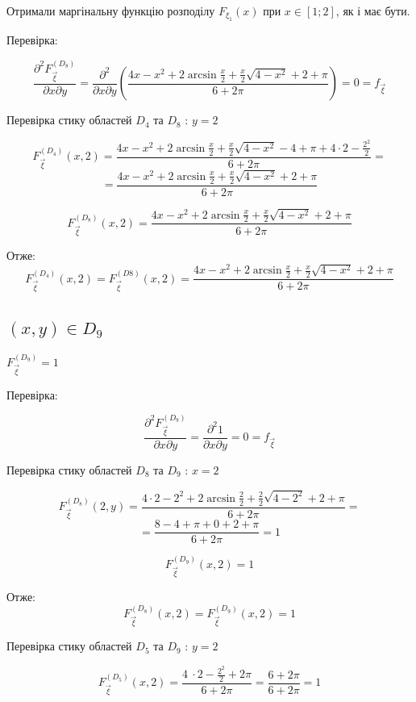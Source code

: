\documentclass[14pt, a4paper, ukrainian]{extreport}
\begin{document}
	Отримали маргінальну функцію розподілу $ F_{\xi_1} (x) $ при $x \in [1; 2]$, як і має бути.
	
	Перевірка:
	
	$$\frac{\partial^2F_{\vec\xi}^{\left(D_8\right)}}{\partial x \partial y} = \frac{\partial^2}{\partial x \partial y} \left(\frac{4x - x^2 + 2\arcsin\frac{x}{2} + \frac{x}{2}\sqrt{4-x^2} + 2 + \pi}{6+2\pi}\right) = 0 = f_{\vec\xi}
	$$
	
	Перевірка стику областей $D_4$ та $D_8$ : $ y = 2$ 
	
	$$ F_{\vec\xi}^{\left({D_4}\right)}(x, 2) = \frac{4x -x^2 + 2\arcsin\frac{x}{2} + \frac{x}{2}\sqrt{4-x^2} - 4 + \pi + 4\cdot 2 - \frac{2^2}{2}}{6+2\pi} = 
	$$
	$$ = \frac{4x -x^2 + 2\arcsin\frac{x}{2} + \frac{x}{2}\sqrt{4-x^2} + 2 + \pi }{6+2\pi}
	$$
	
	$$ F_{\vec\xi}^{\left({D_8}\right)}(x, 2) =  \frac{4x - x^2 + 2\arcsin\frac{x}{2} + \frac{x}{2}\sqrt{4-x^2} + 2 + \pi}{6+2\pi}
	$$
	
	Отже:	
	$$  F_{\vec\xi}^{\left({D_4}\right)}(x, 2) =  F_{\vec\xi}^{\left({D8}\right)}(x, 2) = \frac{4x - x^2 + 2\arcsin\frac{x}{2} + \frac{x}{2}\sqrt{4-x^2} + 2 + \pi}{6+2\pi}
	$$
	
	\subsection{$(x, y) \in D_9$}
	
	$F_{\vec \xi}^{\left(D_9\right)} = 1$
	
	Перевірка: 
	
	$$\frac{\partial^2F_{\vec\xi}^{\left(D_9\right)}}{\partial x \partial y} = \frac{\partial^2 1 }{\partial x \partial y} = 0 = f_{\vec{\xi}}
	$$
	
	Перевірка стику областей $D_8$ та $D_9$ : $ x = 2$ 
	
	$$ F_{\vec\xi}^{\left({D_8}\right)}(2, y) = \frac{4\cdot 2 -2^2 + 2\arcsin\frac{2}{2} + \frac{2}{2}\sqrt{4-2^2} + 2 + \pi }{6+2\pi} = 
	$$
	$$ = \frac{8 -4 + \pi + 0 + 2 + \pi }{6+2\pi} = 1
	$$
	
	$$ F_{\vec\xi}^{\left({D_9}\right)}(x, 2) =  1
	$$
	
	Отже:	
	$$  F_{\vec\xi}^{\left({D_8}\right)}(x, 2) =  F_{\vec\xi}^{\left({D_9}\right)}(x, 2) = 1
	$$
	
	Перевірка стику областей $D_5$ та $D_9$ : $ y = 2$ 
	
	$$ F_{\vec\xi}^{\left({D_5}\right)}(x, 2) = \frac{4 \ \cdot 2 - \frac{2^2}{2} + 2\pi }{6 + 2\pi}= \frac{6 + 2\pi}{6 + 2\pi} = 1
	$$
	
\end{document}
